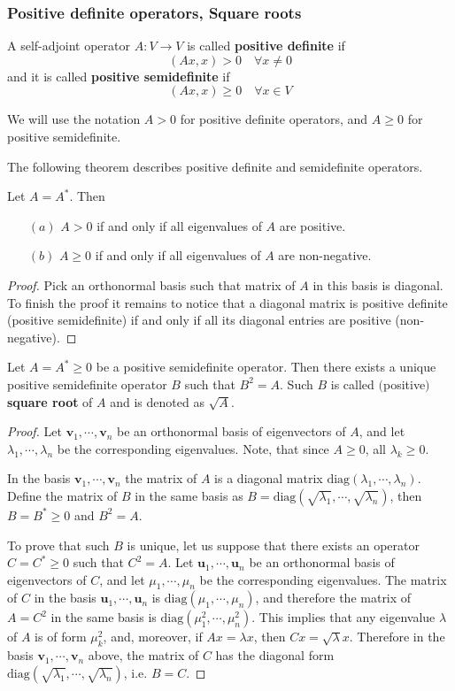 \subsubsection{Positive definite operators, Square roots}
\begin{definition}
A self-adjoint operator $A:V\to V$ is called \textbf{positive definite} if
\[(Ax,x)>0\quad\forall x\neq 0\]
and it is called \textbf{positive semidefinite} if
\[(Ax,x)\geq 0\quad\forall x\in V\]
\end{definition}
We will use the notation $A>0$ for positive definite operators, and $A\geq0$ for positive semidefinite.\par
The following theorem describes positive definite and semidefinite operators.
\begin{proposition}
Let $A=A^*$. Then
\begin{itemize}
\item[$(a)$] $A>0$ if and only if all eigenvalues of $A$ are positive.
\item[$(b)$] $A\geq0$ if and only if all eigenvalues of $A$ are non-negative.
\end{itemize}
\end{proposition}
\begin{proof}
Pick an orthonormal basis such that matrix of $A$ in this basis is diagonal. To finish the proof it remains to notice that a diagonal matrix is positive definite (positive semidefinite) if and only if all its diagonal entries are positive (non-negative).
\end{proof}
\begin{corollary}
Let $A=A^*\geq0$ be a positive semidefinite operator. Then there exists a unique positive semidefinite operator $B$ such that $B^2=A$. Such $B$ is called $($positive$)$ \textbf{square root} of $A$ and is denoted as $\sqrt{A}$.
\end{corollary}
\begin{proof}
Let $\bm{v}_1,\cdots,\bm{v}_n$ be an orthonormal basis of eigenvectors of $A$, and let $\lambda_1,\cdots,\lambda_n$ be the corresponding eigenvalues. Note, that since $A\geq0$, all $\lambda_k\geq0$.\par
In the basis $\bm{v}_1,\cdots,\bm{v}_n$ the matrix of $A$ is a diagonal matrix $\mathrm{diag}(\lambda_1,\cdots,\lambda_n)$. Define the matrix of $B$ in the same basis as $B=\mathrm{diag}(\sqrt{\lambda_1},\cdots,\sqrt{\lambda_n})$, then $B=B^*\geq 0$ and $B^2=A$.\par
To prove that such $B$ is unique, let us suppose that there exists an operator $C=C^*\geq 0$ such that $C^2=A$. Let $\bm{u}_1,\cdots,\bm{u}_n$ be an orthonormal basis of eigenvectors of $C$, and let $\mu_1,\cdots,\mu_n$ be the corresponding eigenvalues. The matrix of $C$ in the basis $\bm{u}_1,\cdots,\bm{u}_n$ is $\mathrm{diag}(\mu_1,\cdots,\mu_n)$, and therefore the matrix of $A=C^2$ in the same basis is $\mathrm{diag}(\mu_1^2,\cdots,\mu_n^2)$. This implies that any eigenvalue $\lambda$ of $A$ is of form $\mu_k^2$, and, moreover, if $Ax=\lambda x$, then $Cx=\sqrt{\lambda}x$. Therefore in the basis $\bm{v}_1,\cdots,\bm{v}_n$ above, the matrix of $C$ has the diagonal form $\mathrm{diag}(\sqrt{\lambda_1},\cdots,\sqrt{\lambda_n})$, i.e. $B=C$.
\end{proof}
